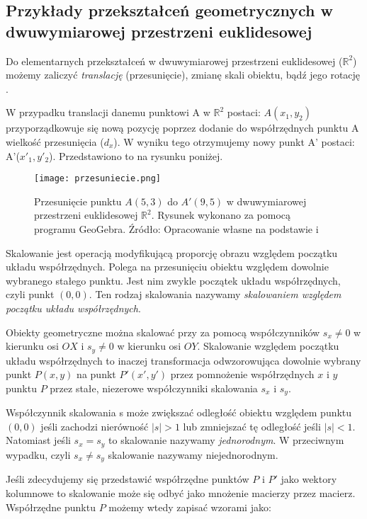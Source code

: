 \subsection{ Przykłady przekształceń geometrycznych w dwuwymiarowej przestrzeni euklidesowej}

Do elementarnych przekształceń w dwuwymiarowej przestrzeni euklidesowej ($\mathbb{R}^{2}$) możemy zaliczyć \textit{translację} (przesunięcie), zmianę skali obiektu, bądź jego rotację \citep[s. 2]{Glowacki2013}.

W przypadku translacji danemu punktowi A w $\mathbb{R}^{2}$ postaci: $A(x_{1}, y_{2})$ przyporządkowuje się nową pozycję poprzez dodanie do współrzędnych punktu A wielkość przesunięcia ($d_{x}$). W wyniku tego otrzymujemy nowy punkt A' postaci: A'($x'_{1}, y'_{2}$). Przedstawiono to na rysunku poniżej.


\begin{figure}[H]
\texttt{[image: przesuniecie.png]}
\caption{Przesunięcie punktu $A(5,3)$ do $A'(9,5)$ w dwuwymiarowej przestrzeni euklidesowej $\mathbb{R}^{2}$. Rysunek wykonano za pomocą programu GeoGebra. Źródło: Opracowanie własne na podstawie \citep[s. 4]{Badura2005} i \citep[s. 3]{Glowacki2013}}
\centering
\end{figure}

Skalowanie jest operacją modyfikującą proporcję obrazu względem początku układu współrzędnych. Polega na przesunięciu obiektu względem dowolnie wybranego stałego punktu. Jest nim zwykle początek układu współrzędnych, czyli punkt $(0,0)$. Ten rodzaj skalowania nazywamy \textit{skalowaniem względem początku układu współrzędnych}.

Obiekty geometryczne można skalować przy za pomocą współczynników $s_{x} \neq 0$ w kierunku osi $OX$ i $s_{y} \neq 0$ w kierunku osi $OY$. Skalowanie względem początku układu współrzędnych to inaczej transformacja odwzorowująca dowolnie wybrany punkt $P(x,y)$ na punkt $P'(x',y')$ przez pomnożenie współrzędnych $x$ i $y$ punktu $P$ przez stałe, niezerowe współczynniki skalowania $s_{x}$ i $s_{y}$.

Współczynnik skalowania s może zwiększać odległość obiektu względem punktu $(0,0)$ jeśli zachodzi nierówność $|s| > 1$ lub zmniejszać tę odległość jeśli $|s| < 1$. Natomiast jeśli $s_{x} = s_{y}$ to skalowanie nazywamy \textit{jednorodnym}. W przeciwnym wypadku, czyli $s_{x} \neq s_{y}$ skalowanie nazywamy niejednorodnym.

Jeśli zdecydujemy się przedstawić współrzędne punktów $P$ i $P'$ jako wektory kolumnowe to skalowanie może się odbyć jako mnożenie macierzy przez macierz. Współrzędne punktu $P$ możemy wtedy zapisać wzorami jako:

